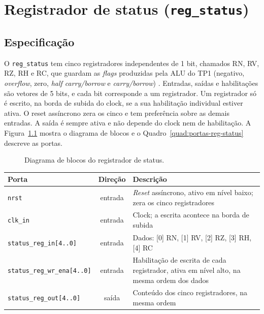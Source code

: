 \chapter{Registrador de status (\texttt{reg\_status})}
\label{cap:reg_status}

\section{Especificação}

O \texttt{reg\_status} tem cinco registradores independentes de 1 bit, chamados RN, RV, RZ, RH e RC, que guardam as \textit{flags} produzidas pela ALU do TP1 (negativo, \textit{overflow}, zero, \textit{half carry/borrow} e \textit{carry/borrow}) \cite{tp2}. Entradas, saídas e habilitações são vetores de 5 bits, e cada bit corresponde a um registrador. Um registrador só é escrito, na borda de subida do clock, se a sua habilitação individual estiver ativa. O reset assíncrono zera os cinco e tem preferência sobre as demais entradas. A saída é sempre ativa e não depende do clock nem de habilitação. A Figura~\ref{fig:bloco-reg-status} mostra o diagrama de blocos e o Quadro~\ref{quad:portas-reg-status} descreve as portas.

\begin{figure}[htb]
\caption{Diagrama de blocos do registrador de status.}\label{fig:bloco-reg-status}
\centering
{}
\end{figure}

\begin{quadro}[htb]
  \caption{Portas do registrador de status.}
  \label{quad:portas-reg-status}
  \centering
  \begin{tabular}{lcp{7.4cm}}
    \hline
    Porta & Direção & Descrição \\ \hline
    \texttt{nrst} & entrada & \textit{Reset} assíncrono, ativo em nível baixo; zera os cinco registradores \\
    \texttt{clk\_in} & entrada & Clock; a escrita acontece na borda de subida \\
    \texttt{status\_reg\_in[4..0]} & entrada & Dados: [0] RN, [1] RV, [2] RZ, [3] RH, [4] RC \\
    \texttt{status\_reg\_wr\_ena[4..0]} & entrada & Habilitação de escrita de cada registrador, ativa em nível alto, na mesma ordem dos dados \\
    \texttt{status\_reg\_out[4..0]} & saída & Conteúdo dos cinco registradores, na mesma ordem \\ \hline
  \end{tabular}
\end{quadro}

